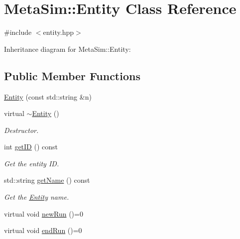 \hypertarget{classMetaSim_1_1Entity}{}\section{Meta\+Sim\+:\+:Entity Class Reference}
\label{classMetaSim_1_1Entity}


{\ttfamily \#include $<$entity.\+hpp$>$}



Inheritance diagram for Meta\+Sim\+:\+:Entity\+:
\subsection*{Public Member Functions}
\begin{DoxyCompactItemize}
\item 
\hyperlink{classMetaSim_1_1Entity_ab6c2688e3fde92d5509c4352b027840d}{Entity} (const std\+::string \&n)
\item 
virtual \hyperlink{classMetaSim_1_1Entity_ad81ed7213e5d954cad14d71edabf5b77}{$\sim$\+Entity} ()\hypertarget{classMetaSim_1_1Entity_ad81ed7213e5d954cad14d71edabf5b77}{}\label{classMetaSim_1_1Entity_ad81ed7213e5d954cad14d71edabf5b77}

\begin{DoxyCompactList}\small\item\em Destructor. \end{DoxyCompactList}\item 
int \hyperlink{classMetaSim_1_1Entity_adf93a70d513582b2783dc01bdcf7720e}{get\+ID} () const \hypertarget{classMetaSim_1_1Entity_adf93a70d513582b2783dc01bdcf7720e}{}\label{classMetaSim_1_1Entity_adf93a70d513582b2783dc01bdcf7720e}

\begin{DoxyCompactList}\small\item\em Get the entity ID. \end{DoxyCompactList}\item 
std\+::string \hyperlink{classMetaSim_1_1Entity_a15db7190ea7c9f49333ca0185e0a64e0}{get\+Name} () const \hypertarget{classMetaSim_1_1Entity_a15db7190ea7c9f49333ca0185e0a64e0}{}\label{classMetaSim_1_1Entity_a15db7190ea7c9f49333ca0185e0a64e0}

\begin{DoxyCompactList}\small\item\em Get the \hyperlink{classMetaSim_1_1Entity}{Entity} name. \end{DoxyCompactList}\item 
virtual void \hyperlink{classMetaSim_1_1Entity_a8d146c2ea3472c964f84cf20880ac0c9}{new\+Run} ()=0
\item 
virtual void \hyperlink{classMetaSim_1_1Entity_aaf0dfabd7805ec027aa46b9b94a87e5b}{end\+Run} ()=0
\end{DoxyCompactItemize}

